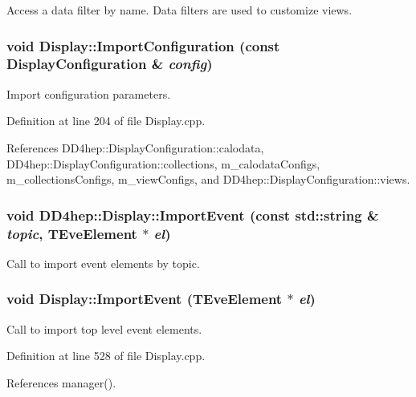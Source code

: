 Access a data filter by name. Data filters are used to customize views. \hypertarget{class_d_d4hep_1_1_display_a3dfe74c5f4b7f1547ccf07ccba8b6d39}{
\subsubsection[{ImportConfiguration}]{\setlength{\rightskip}{0pt plus 5cm}void Display::ImportConfiguration (const {\bf DisplayConfiguration} \& {\em config})}}
\label{class_d_d4hep_1_1_display_a3dfe74c5f4b7f1547ccf07ccba8b6d39}


Import configuration parameters. 

Definition at line 204 of file Display.cpp.

References DD4hep::DisplayConfiguration::calodata, DD4hep::DisplayConfiguration::collections, m\_\-calodataConfigs, m\_\-collectionsConfigs, m\_\-viewConfigs, and DD4hep::DisplayConfiguration::views.\hypertarget{class_d_d4hep_1_1_display_a4e4468f23cce5076fbd862bc414742c3}{
\subsubsection[{ImportEvent}]{\setlength{\rightskip}{0pt plus 5cm}void DD4hep::Display::ImportEvent (const std::string \& {\em topic}, \/  TEveElement $\ast$ {\em el})}}
\label{class_d_d4hep_1_1_display_a4e4468f23cce5076fbd862bc414742c3}


Call to import event elements by topic. \hypertarget{class_d_d4hep_1_1_display_a873232e99e43ac05e012104197a37777}{
\subsubsection[{ImportEvent}]{\setlength{\rightskip}{0pt plus 5cm}void Display::ImportEvent (TEveElement $\ast$ {\em el})}}
\label{class_d_d4hep_1_1_display_a873232e99e43ac05e012104197a37777}


Call to import top level event elements. 

Definition at line 528 of file Display.cpp.

References manager().

